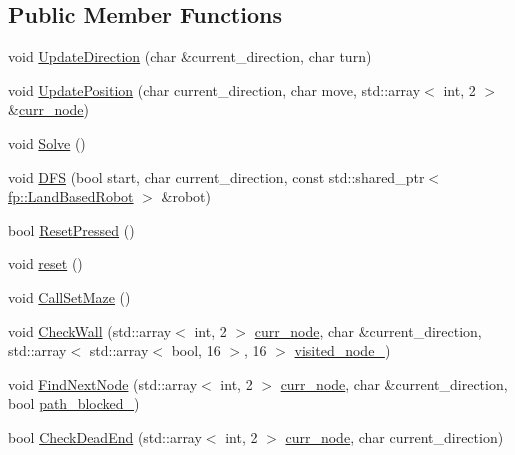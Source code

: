 \subsection*{Public Member Functions}
\begin{DoxyCompactItemize}
\item 
void \hyperlink{classfp_1_1_algorithm_ab91291b423ce58ba86e317112ca0c5ba}{Update\+Direction} (char \&current\+\_\+direction, char turn)
\item 
void \hyperlink{classfp_1_1_algorithm_a14f37fd87d690a5db6a38ea63cd1aeb1}{Update\+Position} (char current\+\_\+direction, char move, std\+::array$<$ int, 2 $>$ \&\hyperlink{classfp_1_1_algorithm_a88395e8c0b52c4aef33b41caff21300c}{curr\+\_\+node})
\item 
void \hyperlink{classfp_1_1_algorithm_ac6e4cae1f140d0155f2feaaaf1d287c1}{Solve} ()
\item 
void \hyperlink{classfp_1_1_algorithm_a5c0c5a23c677797bbe4b9616f1bfded6}{D\+FS} (bool start, char current\+\_\+direction, const std\+::shared\+\_\+ptr$<$ \hyperlink{classfp_1_1_land_based_robot}{fp\+::\+Land\+Based\+Robot} $>$ \&robot)
\item 
bool \hyperlink{classfp_1_1_algorithm_a169e9e4e400a85687aa6554a3cbd2e04}{Reset\+Pressed} ()
\item 
void \hyperlink{classfp_1_1_algorithm_a182de09af3489ef37ea0fd4a4baeacbc}{reset} ()
\item 
void \hyperlink{classfp_1_1_algorithm_a434cfecd6898f4e89ba632433fa19afd}{Call\+Set\+Maze} ()
\item 
void \hyperlink{classfp_1_1_algorithm_ac82185822a00aa4b08266207ca4b7e26}{Check\+Wall} (std\+::array$<$ int, 2 $>$ \hyperlink{classfp_1_1_algorithm_a88395e8c0b52c4aef33b41caff21300c}{curr\+\_\+node}, char \&current\+\_\+direction, std\+::array$<$ std\+::array$<$ bool, 16 $>$, 16 $>$ \hyperlink{classfp_1_1_algorithm_a41904cf962dd8c46901d39ab03d77545}{visited\+\_\+node\+\_\+})
\item 
void \hyperlink{classfp_1_1_algorithm_a363e9198e1a2f95caa581b5b9e90efb6}{Find\+Next\+Node} (std\+::array$<$ int, 2 $>$ \hyperlink{classfp_1_1_algorithm_a88395e8c0b52c4aef33b41caff21300c}{curr\+\_\+node}, char \&current\+\_\+direction, bool \hyperlink{classfp_1_1_algorithm_a7a37ba8431c685c42f305a73812efecb}{path\+\_\+blocked\+\_\+})
\item 
bool \hyperlink{classfp_1_1_algorithm_a2309270f8f6276d6f421328239269d3a}{Check\+Dead\+End} (std\+::array$<$ int, 2 $>$ \hyperlink{classfp_1_1_algorithm_a88395e8c0b52c4aef33b41caff21300c}{curr\+\_\+node}, char current\+\_\+direction)

\end{DoxyCompactItemize}
